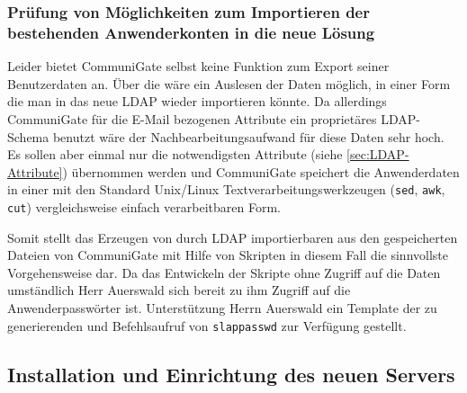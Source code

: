 \documentclass[11pt,a4paper,titlepage=firstiscover]{scrartcl} %
\begin{document}
\subsubsection{Prüfung von Möglichkeiten zum Importieren der bestehenden Anwenderkonten in die neue Lösung} \label{sec:Importsuche}
Leider bietet CommuniGate selbst keine Funktion zum Export seiner Benutzerdaten 
an. Über die  wäre ein Auslesen der Daten möglich, in einer Form die man in das neue LDAP wieder importieren könnte. Da allerdings CommuniGate für die E-Mail bezogenen Attribute ein proprietäres LDAP-Schema benutzt wäre der Nachbearbeitungsaufwand für diese Daten sehr hoch. Es sollen aber einmal nur die notwendigsten Attribute (siehe \autoref{sec:LDAP-Attribute}) übernommen werden und CommuniGate speichert die Anwenderdaten in einer mit den Standard Unix/Linux Textverarbeitungswerkzeugen (\texttt{sed}, \texttt{awk}, \texttt{cut}) vergleichsweise einfach verarbeitbaren Form. 

Somit stellt das Erzeugen von durch LDAP importierbaren 
 aus den gespeicherten Dateien von CommuniGate 
mit Hilfe von Skripten in diesem Fall die sinnvollste Vorgehensweise dar. Da 
das Entwickeln der Skripte ohne Zugriff auf die Daten umständlich  
 Herr Auerswald sich bereit  zu 
 ihm Zugriff auf die Anwenderpasswörter 
 ist.  Unterstützung   Herrn Auerswald ein 
Template der zu generierenden  und  
Befehlsaufruf von \texttt{slappasswd} zur Verfügung gestellt. 

\subsection{Installation und Einrichtung des neuen Servers}
\end{document}
